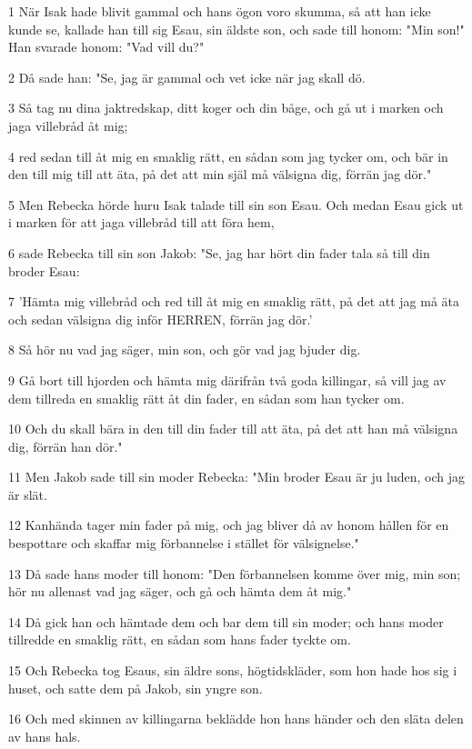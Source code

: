 \par 1 När Isak hade blivit gammal och hans ögon voro skumma, så att han icke kunde se, kallade han till sig Esau, sin äldste son, och sade till honom: "Min son!" Han svarade honom: "Vad vill du?"
\par 2 Då sade han: "Se, jag är gammal och vet icke när jag skall dö.
\par 3 Så tag nu dina jaktredskap, ditt koger och din båge, och gå ut i marken och jaga villebråd åt mig;
\par 4 red sedan till åt mig en smaklig rätt, en sådan som jag tycker om, och bär in den till mig till att äta, på det att min själ må välsigna dig, förrän jag dör."
\par 5 Men Rebecka hörde huru Isak talade till sin son Esau. Och medan Esau gick ut i marken för att jaga villebråd till att föra hem,
\par 6 sade Rebecka till sin son Jakob: "Se, jag har hört din fader tala så till din broder Esau:
\par 7 'Hämta mig villebråd och red till åt mig en smaklig rätt, på det att jag må äta och sedan välsigna dig inför HERREN, förrän jag dör.'
\par 8 Så hör nu vad jag säger, min son, och gör vad jag bjuder dig.
\par 9 Gå bort till hjorden och hämta mig därifrån två goda killingar, så vill jag av dem tillreda en smaklig rätt åt din fader, en sådan som han tycker om.
\par 10 Och du skall bära in den till din fader till att äta, på det att han må välsigna dig, förrän han dör."
\par 11 Men Jakob sade till sin moder Rebecka: "Min broder Esau är ju luden, och jag är slät.
\par 12 Kanhända tager min fader på mig, och jag bliver då av honom hållen för en bespottare och skaffar mig förbannelse i stället för välsignelse."
\par 13 Då sade hans moder till honom: "Den förbannelsen komme över mig, min son; hör nu allenast vad jag säger, och gå och hämta dem åt mig."
\par 14 Då gick han och hämtade dem och bar dem till sin moder; och hans moder tillredde en smaklig rätt, en sådan som hans fader tyckte om.
\par 15 Och Rebecka tog Esaus, sin äldre sons, högtidskläder, som hon hade hos sig i huset, och satte dem på Jakob, sin yngre son.
\par 16 Och med skinnen av killingarna beklädde hon hans händer och den släta delen av hans hals.
